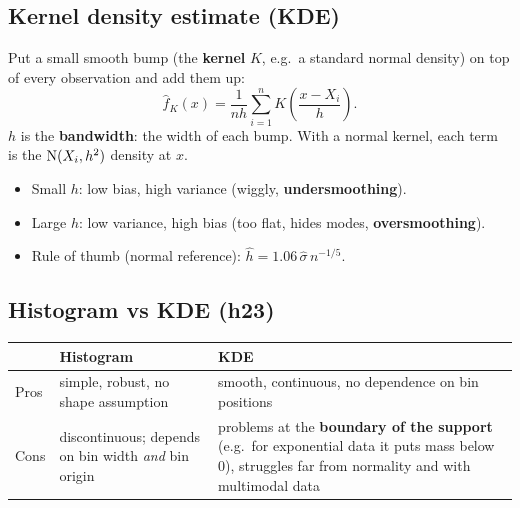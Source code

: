 \subsection{Kernel density estimate (KDE)}
Put a small smooth bump (the \textbf{kernel} $K$, e.g.\ a standard normal density) on top of every observation and add them up:
\[
\hat f_K(x) = \frac1{nh}\sum_{i=1}^n K\left(\frac{x-X_i}{h}\right).
\]
$h$ is the \textbf{bandwidth}: the width of each bump. With a normal kernel, each term is the $\mathrm{N}(X_i,h^2)$ density at $x$.
\begin{itemize}
  \item Small $h$: low bias, high variance (wiggly, \textbf{undersmoothing}).
  \item Large $h$: low variance, high bias (too flat, hides modes, \textbf{oversmoothing}).
  \item Rule of thumb (normal reference): $\hat h = 1.06\,\hat\sigma\,n^{-1/5}$.
\end{itemize}

\subsection{Histogram vs KDE (h23)}
\begin{center}
\begin{tabularx}{\textwidth}{lXX}
\toprule
 & Histogram & KDE \\
\midrule
Pros & simple, robust, no shape assumption & smooth, continuous, no dependence on bin positions \\
Cons & discontinuous; depends on bin width \emph{and} bin origin & problems at the \textbf{boundary of the support} (e.g.\ for exponential data it puts mass below 0), struggles far from normality and with multimodal data \\
\bottomrule
\end{tabularx}
\end{center}

\newpage
